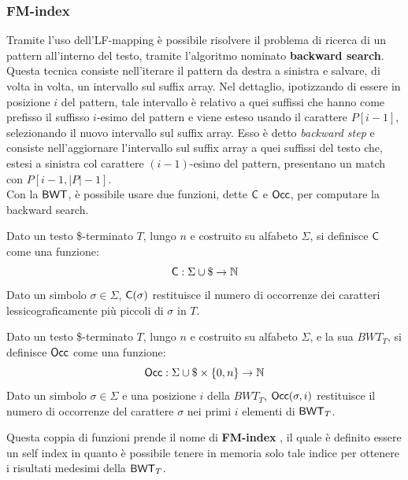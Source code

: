 \subsubsection{FM-index}
Tramite l'uso dell'LF-mapping è possibile risolvere il problema di
ricerca di un pattern all'interno del testo, tramite l'algoritmo nominato
\textbf{backward search}. Questa tecnica consiste nell'iterare il pattern da
destra a sinistra e
salvare, di volta in volta, un intervallo sul suffix array. Nel
dettaglio, ipotizzando di essere in posizione $i$ del pattern, tale
intervallo è relativo a quei suffissi che hanno come prefisso il suffisso
$i$-esimo del pattern e viene esteso usando il carattere
$P[i-1]$, selezionando il nuovo intervallo sul suffix array. Esso è detto
\textit{backward step} e consiste nell'aggiornare
l'intervallo sul suffix array a quei suffissi del testo che, estesi a sinistra
col carattere $(i-1)$-esimo del pattern, presentano un match con $P[i-1,
|P|-1]$.\\   
Con la $\mbox{\rm {\sf BWT}}$, è possibile usare due funzioni, dette $\mbox{\rm {\sf C}}$ e $\mbox{\rm {\sf Occ}}$, per
computare la backward search.
\begin{definizione}
  Dato un testo \$-terminato $T$, lungo $n$ e costruito su alfabeto $\Sigma$, si
  definisce $\mbox{\rm {\sf C}}$ come una funzione:
  \begin{equation}
    \label{eq:bwt4}
    \mbox{\rm {\sf C}}:\Sigma\cup \$\to \mathbb{N}
  \end{equation}
  Dato un simbolo $\sigma\in\Sigma$, $\mbox{\rm {\sf C}}(\sigma)$ restituisce il
  numero di 
  occorrenze dei caratteri lessicograficamente più piccoli di $\sigma$ in $T$.
\end{definizione}
\begin{definizione}
  Dato un testo \$-terminato $T$, lungo $n$ e costruito su alfabeto $\Sigma$, e
  la sua $BWT_T$, si definisce $\mbox{\rm {\sf Occ}}$ come una funzione:
  \begin{equation}
    \label{eq:bwt5}
    \mbox{\rm {\sf Occ}}:\Sigma\cup \$\times \{0,n\}\to \mathbb{N}
  \end{equation}
  Dato un simbolo $\sigma\in\Sigma$ e una posizione $i$ della
  $BWT_T$, $\mbox{\rm {\sf Occ}}(\sigma,i)$ restituisce il numero di occorrenze del carattere
  $\sigma$ nei primi $i$ elementi di $\mbox{\rm {\sf BWT}}_T$.
\end{definizione}
Questa coppia di funzioni prende il nome di \textbf{FM-index} \cite{fm}, il
quale è definito essere un self index in quanto è possibile tenere in
memoria solo tale indice per ottenere i risultati medesimi della $\mbox{\rm {\sf BWT}}_T$.
